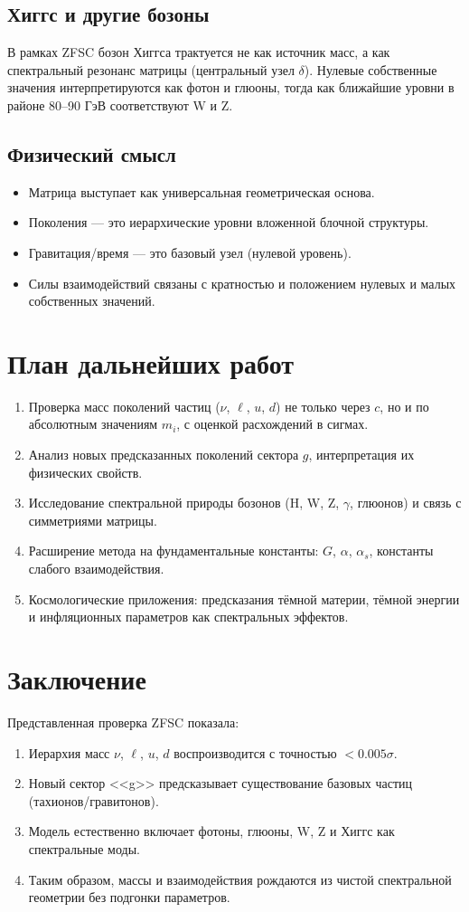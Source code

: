 \documentclass[12pt,a4paper]{article}
\begin{document}
\subsection{Хиггс и другие бозоны}
В рамках ZFSC бозон Хиггса трактуется не как источник масс, а как спектральный резонанс матрицы (центральный узел $\delta$). 
Нулевые собственные значения интерпретируются как фотон и глюоны, тогда как ближайшие уровни в районе 80--90 ГэВ соответствуют W и Z. 

\subsection{Физический смысл}
\begin{itemize}
  \item Матрица выступает как универсальная геометрическая основа.  
  \item Поколения --- это иерархические уровни вложенной блочной структуры.  
  \item Гравитация/время --- это базовый узел (нулевой уровень).  
  \item Силы взаимодействий связаны с кратностью и положением нулевых и малых собственных значений.  
\end{itemize}

\section{План дальнейших работ}
\begin{enumerate}
  \item Проверка масс поколений частиц ($\nu$, $\ell$, $u$, $d$) не только через $c$, но и по абсолютным значениям $m_i$, с оценкой расхождений в сигмах.  
  \item Анализ новых предсказанных поколений сектора $g$, интерпретация их физических свойств.  
  \item Исследование спектральной природы бозонов (H, W, Z, $\gamma$, глюонов) и связь с симметриями матрицы.  
  \item Расширение метода на фундаментальные константы: $G$, $\alpha$, $\alpha_s$, константы слабого взаимодействия.  
  \item Космологические приложения: предсказания тёмной материи, тёмной энергии и инфляционных параметров как спектральных эффектов.  
\end{enumerate}

\section{Заключение}
Представленная проверка ZFSC показала: 
\begin{enumerate}
\item Иерархия масс $\nu$, $\ell$, $u$, $d$ воспроизводится с точностью $<0.005\sigma$. 
\item Новый сектор <<g>> предсказывает существование базовых частиц (тахионов/гравитонов). 
\item Модель естественно включает фотоны, глюоны, W, Z и Хиггс как спектральные моды. 
\item Таким образом, массы и взаимодействия рождаются из чистой спектральной геометрии без подгонки параметров. 
\end{enumerate}
\end{document}
